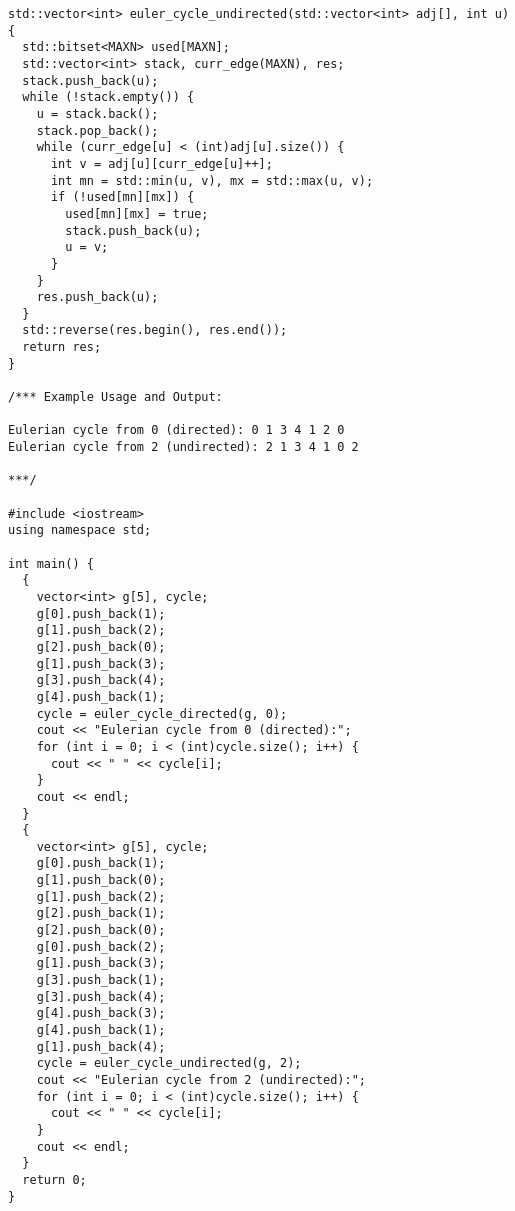 \begin{lstlisting}
std::vector<int> euler_cycle_undirected(std::vector<int> adj[], int u) {
  std::bitset<MAXN> used[MAXN];
  std::vector<int> stack, curr_edge(MAXN), res;
  stack.push_back(u);
  while (!stack.empty()) {
    u = stack.back();
    stack.pop_back();
    while (curr_edge[u] < (int)adj[u].size()) {
      int v = adj[u][curr_edge[u]++];
      int mn = std::min(u, v), mx = std::max(u, v);
      if (!used[mn][mx]) {
        used[mn][mx] = true;
        stack.push_back(u);
        u = v;
      }
    }
    res.push_back(u);
  }
  std::reverse(res.begin(), res.end());
  return res;
}

/*** Example Usage and Output:

Eulerian cycle from 0 (directed): 0 1 3 4 1 2 0
Eulerian cycle from 2 (undirected): 2 1 3 4 1 0 2

***/

#include <iostream>
using namespace std;

int main() {
  {
    vector<int> g[5], cycle;
    g[0].push_back(1);
    g[1].push_back(2);
    g[2].push_back(0);
    g[1].push_back(3);
    g[3].push_back(4);
    g[4].push_back(1);
    cycle = euler_cycle_directed(g, 0);
    cout << "Eulerian cycle from 0 (directed):";
    for (int i = 0; i < (int)cycle.size(); i++) {
      cout << " " << cycle[i];
    }
    cout << endl;
  }
  {
    vector<int> g[5], cycle;
    g[0].push_back(1);
    g[1].push_back(0);
    g[1].push_back(2);
    g[2].push_back(1);
    g[2].push_back(0);
    g[0].push_back(2);
    g[1].push_back(3);
    g[3].push_back(1);
    g[3].push_back(4);
    g[4].push_back(3);
    g[4].push_back(1);
    g[1].push_back(4);
    cycle = euler_cycle_undirected(g, 2);
    cout << "Eulerian cycle from 2 (undirected):";
    for (int i = 0; i < (int)cycle.size(); i++) {
      cout << " " << cycle[i];
    }
    cout << endl;
  }
  return 0;
}
\end{lstlisting}
